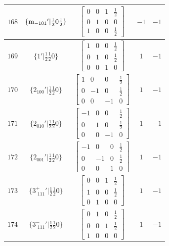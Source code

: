 \documentclass[fleqn,8pt]{jsarticle}
\begin{document}
\begin{longtable}{ccccc}
$ 168 $ & $ \{{\rm m}_{-101}{}'|\frac{1}{2} 0 \frac{1}{2}\} $ & $ \begin{bmatrix} 0 & 0 & 1 & \frac{1}{2} \\ 0 & 1 & 0 & 0 \\ 1 & 0 & 0 & \frac{1}{2} \end{bmatrix} $ & $ -1 $ & $ -1 $ \\ \hline
$ 169 $ & $ \{1{}'|\frac{1}{2} \frac{1}{2} 0\} $ & $ \begin{bmatrix} 1 & 0 & 0 & \frac{1}{2} \\ 0 & 1 & 0 & \frac{1}{2} \\ 0 & 0 & 1 & 0 \end{bmatrix} $ & $ 1 $ & $ -1 $ \\ \hline
$ 170 $ & $ \{2{}_{100}{}'|\frac{1}{2} \frac{1}{2} 0\} $ & $ \begin{bmatrix} 1 & 0 & 0 & \frac{1}{2} \\ 0 & -1 & 0 & \frac{1}{2} \\ 0 & 0 & -1 & 0 \end{bmatrix} $ & $ 1 $ & $ -1 $ \\ \hline
$ 171 $ & $ \{2{}_{010}{}'|\frac{1}{2} \frac{1}{2} 0\} $ & $ \begin{bmatrix} -1 & 0 & 0 & \frac{1}{2} \\ 0 & 1 & 0 & \frac{1}{2} \\ 0 & 0 & -1 & 0 \end{bmatrix} $ & $ 1 $ & $ -1 $ \\ \hline
$ 172 $ & $ \{2{}_{001}{}'|\frac{1}{2} \frac{1}{2} 0\} $ & $ \begin{bmatrix} -1 & 0 & 0 & \frac{1}{2} \\ 0 & -1 & 0 & \frac{1}{2} \\ 0 & 0 & 1 & 0 \end{bmatrix} $ & $ 1 $ & $ -1 $ \\ \hline
$ 173 $ & $ \{3^{+}_{\,\,111}{}'|\frac{1}{2} \frac{1}{2} 0\} $ & $ \begin{bmatrix} 0 & 0 & 1 & \frac{1}{2} \\ 1 & 0 & 0 & \frac{1}{2} \\ 0 & 1 & 0 & 0 \end{bmatrix} $ & $ 1 $ & $ -1 $ \\ \hline
$ 174 $ & $ \{3^{-}_{\,\,111}{}'|\frac{1}{2} \frac{1}{2} 0\} $ & $ \begin{bmatrix} 0 & 1 & 0 & \frac{1}{2} \\ 0 & 0 & 1 & \frac{1}{2} \\ 1 & 0 & 0 & 0 \end{bmatrix} $ & $ 1 $ & $ -1 $ \\ \hline

\end{longtable}
\end{document}
